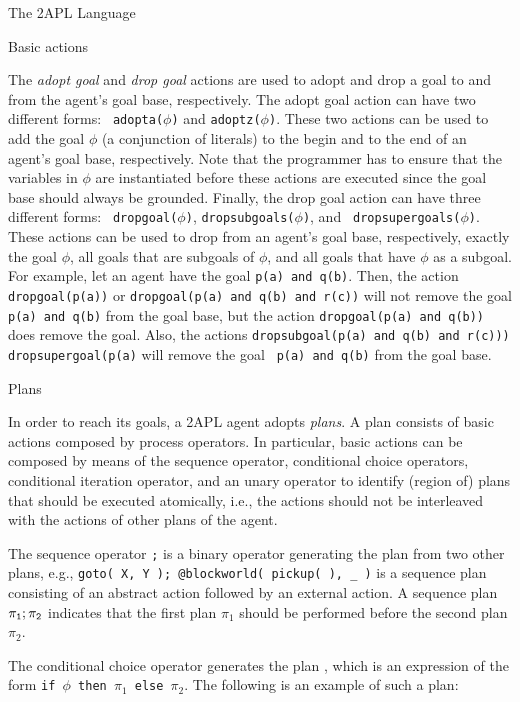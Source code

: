 \begin{chapter}{The 2APL Language}
\begin{section}{Basic actions}
\begin{subsection}
The \emph{adopt goal} and \emph{drop goal} actions are used to adopt
and drop a goal to and from the agent's goal base, respectively. The
adopt goal action  can have two different forms: {\tt
adopta($\phi$)} and {\tt adoptz($\phi$)}. These two actions can be
used to add the goal $\phi$ (a conjunction of literals) to the begin
and to the end of an agent's goal base, respectively. Note that the
programmer has to ensure that the variables in $\phi$ are
instantiated before these actions are executed since the goal base
should always be grounded. Finally, the drop goal action
 can have three different forms: {\tt
dropgoal($\phi$)}, {\tt dropsubgoals($\phi$)}, and {\tt
dropsupergoals($\phi$)}. These actions can be used to drop from an
agent's goal base, respectively, exactly the goal $\phi$, all goals
that are subgoals of $\phi$, and all goals that have $\phi$ as a
subgoal. For example, let an agent have the goal {\tt p(a) and
q(b)}. Then, the action {\tt dropgoal(p(a))} or {\tt dropgoal(p(a)
and q(b) and r(c))} will not remove the goal {\tt p(a) and q(b)}
from the goal base, but the action {\tt dropgoal(p(a) and q(b))}
does remove the goal. Also, the actions {\tt dropsubgoal(p(a) and
q(b) and r(c)))} {\tt dropsupergoal(p(a)} will remove the goal {\tt
p(a) and q(b)} from the goal base.
\end{subsection}
\end{section}


\begin{section}{Plans}

In order to reach its goals, a 2APL agent adopts \emph{plans}. A
plan consists of basic actions composed by process operators. In
particular, basic actions can be composed by means of the sequence
operator, conditional choice operators, conditional iteration
operator, and an unary operator to identify (region of) plans that
should be executed atomically, i.e., the actions should not be
interleaved with the actions of other plans of the agent.

The sequence operator {\tt ;} is a binary operator generating the
plan  from two other plans, e.g., {\tt goto( X, Y
); @blockworld( pickup( ), \_ )} is a sequence plan consisting of an
abstract action followed by an external action. A sequence plan
${\tt \pi_1;\pi_2}$ indicates that the first plan $\pi_1$ should be
performed before the second plan $\pi_2$.

The conditional choice operator generates the plan ,
which is an expression of the form {\tt if $\phi$ then $\pi_1$ else
$\pi_2$}. The following is an example of such a plan:


\end{section}
\end{chapter}
